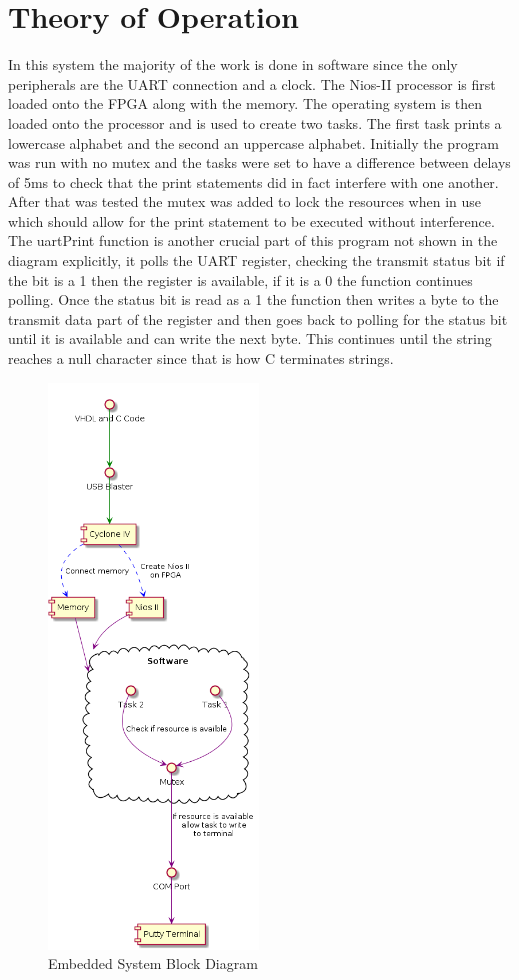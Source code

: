 \documentclass[10pt,a4paper]{article}
\begin{document}
	\section{Theory of Operation}
	In this system the majority of the work is done in software since the only peripherals are the UART connection and  a clock. The Nios-II processor is first loaded onto the FPGA along with the memory. The operating system is then loaded onto the processor and is used to create two tasks. The first task prints a lowercase alphabet and the second an uppercase alphabet. Initially the program was run with no mutex and the tasks were set to have a difference between delays of 5ms to check that the print statements did in fact interfere with one another. After that was tested the mutex was added to lock the resources when in use which should allow for the print statement to be executed without interference. The uartPrint function is another crucial part of this program not shown in the diagram explicitly, it polls the UART register, checking the transmit status bit if the bit is a 1 then the register is available, if it is a 0 the function continues polling. Once the status bit is read as a 1 the function then writes a byte to the transmit data part of the register and then goes back to polling for the status bit until it is available and can write the next byte. This continues until the string reaches a null character since that is how C terminates strings. 
	\begin{figure}[H]
		\centering\includegraphics[height=15cm]{HW4_Block.png}
		\caption{Embedded System Block Diagram}
		\label{block}
	\end{figure}
\end{document}
